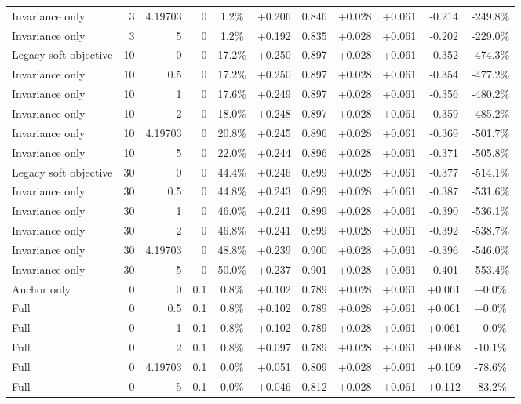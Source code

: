 \begin{table}[htbp]
\begin{tabular}{lrrrccccccc}
Invariance only & 3 & 4.19703 & 0 & 1.2\% & +0.206 & 0.846 & +0.028 & +0.061 & -0.214 & -249.8\% \\
Invariance only & 3 & 5 & 0 & 1.2\% & +0.192 & 0.835 & +0.028 & +0.061 & -0.202 & -229.0\% \\
Legacy soft objective & 10 & 0 & 0 & 17.2\% & +0.250 & 0.897 & +0.028 & +0.061 & -0.352 & -474.3\% \\
Invariance only & 10 & 0.5 & 0 & 17.2\% & +0.250 & 0.897 & +0.028 & +0.061 & -0.354 & -477.2\% \\
Invariance only & 10 & 1 & 0 & 17.6\% & +0.249 & 0.897 & +0.028 & +0.061 & -0.356 & -480.2\% \\
Invariance only & 10 & 2 & 0 & 18.0\% & +0.248 & 0.897 & +0.028 & +0.061 & -0.359 & -485.2\% \\
Invariance only & 10 & 4.19703 & 0 & 20.8\% & +0.245 & 0.896 & +0.028 & +0.061 & -0.369 & -501.7\% \\
Invariance only & 10 & 5 & 0 & 22.0\% & +0.244 & 0.896 & +0.028 & +0.061 & -0.371 & -505.8\% \\
Legacy soft objective & 30 & 0 & 0 & 44.4\% & +0.246 & 0.899 & +0.028 & +0.061 & -0.377 & -514.1\% \\
Invariance only & 30 & 0.5 & 0 & 44.8\% & +0.243 & 0.899 & +0.028 & +0.061 & -0.387 & -531.6\% \\
Invariance only & 30 & 1 & 0 & 46.0\% & +0.241 & 0.899 & +0.028 & +0.061 & -0.390 & -536.1\% \\
Invariance only & 30 & 2 & 0 & 46.8\% & +0.241 & 0.899 & +0.028 & +0.061 & -0.392 & -538.7\% \\
Invariance only & 30 & 4.19703 & 0 & 48.8\% & +0.239 & 0.900 & +0.028 & +0.061 & -0.396 & -546.0\% \\
Invariance only & 30 & 5 & 0 & 50.0\% & +0.237 & 0.901 & +0.028 & +0.061 & -0.401 & -553.4\% \\
Anchor only & 0 & 0 & 0.1 & 0.8\% & +0.102 & 0.789 & +0.028 & +0.061 & +0.061 & +0.0\% \\
Full & 0 & 0.5 & 0.1 & 0.8\% & +0.102 & 0.789 & +0.028 & +0.061 & +0.061 & +0.0\% \\
Full & 0 & 1 & 0.1 & 0.8\% & +0.102 & 0.789 & +0.028 & +0.061 & +0.061 & +0.0\% \\
Full & 0 & 2 & 0.1 & 0.8\% & +0.097 & 0.789 & +0.028 & +0.061 & +0.068 & -10.1\% \\
Full & 0 & 4.19703 & 0.1 & 0.0\% & +0.051 & 0.809 & +0.028 & +0.061 & +0.109 & -78.6\% \\
Full & 0 & 5 & 0.1 & 0.0\% & +0.046 & 0.812 & +0.028 & +0.061 & +0.112 & -83.2\% \\

\end{tabular}
\end{table}
